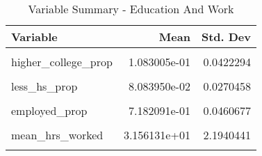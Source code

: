 \begin{table}[H]

\caption{\label{tab:tab:education_and_work}Variable Summary - Education And Work}
\centering
\begin{tabular}[t]{lrr}
\toprule
Variable & Mean & Std. Dev\\
\midrule
\cellcolor{gray!6}{college\_prop} & \cellcolor{gray!6}{1.938955e-01} & \cellcolor{gray!6}{0.0344116}\\
higher\_college\_prop & 1.083005e-01 & 0.0422294\\
\cellcolor{gray!6}{hs\_prop} & \cellcolor{gray!6}{3.656381e-01} & \cellcolor{gray!6}{0.0495126}\\
less\_hs\_prop & 8.083950e-02 & 0.0270458\\
\cellcolor{gray!6}{some\_college\_prop} & \cellcolor{gray!6}{2.513264e-01} & \cellcolor{gray!6}{0.0354394}\\
\addlinespace
employed\_prop & 7.182091e-01 & 0.0460677\\
\cellcolor{gray!6}{not\_employed\_prop} & \cellcolor{gray!6}{2.817909e-01} & \cellcolor{gray!6}{0.0460677}\\
mean\_hrs\_worked & 3.156131e+01 & 2.1940441\\
\cellcolor{gray!6}{median\_income} & \cellcolor{gray!6}{2.294970e+04} & \cellcolor{gray!6}{5324.1136079}\\
\bottomrule
\end{tabular}
\end{table}
